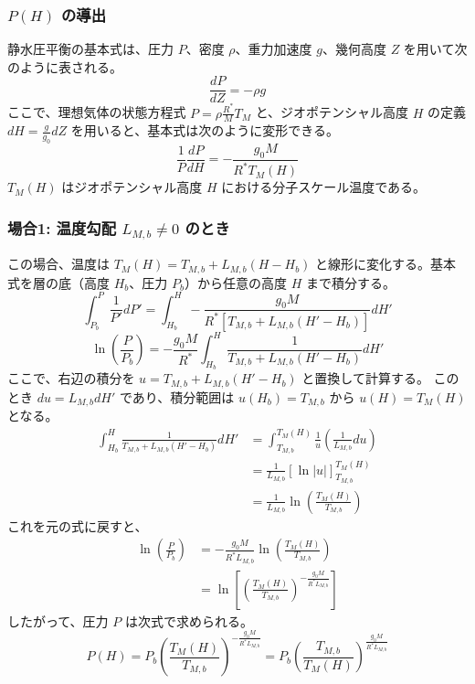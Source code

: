 \documentclass[a4paper,12pt]{article}
\begin{document}
\subsubsection*{$P(H)$ の導出}

静水圧平衡の基本式は、圧力 $P$、密度 $\rho$、重力加速度 $g$、幾何高度 $Z$ を用いて次のように表される。
\[
\frac{dP}{dZ} = - \rho g
\]
ここで、理想気体の状態方程式 $P = \rho \frac{R^*}{M} T_M$ と、ジオポテンシャル高度 $H$ の定義 $dH = \frac{g}{g_0} dZ$ を用いると、基本式は次のように変形できる。
\[
\frac{1}{P}\frac{dP}{dH} = -\frac{g_0 M}{R^*T_M(H)}
\]
$T_M(H)$ はジオポテンシャル高度 $H$ における分子スケール温度である。

\subsubsection*{場合1: 温度勾配 $L_{M,b} \neq 0$ のとき}

この場合、温度は $T_M(H) = T_{M,b} + L_{M,b}(H - H_b)$ と線形に変化する。基本式を層の底（高度 $H_b$、圧力 $P_b$）から任意の高度 $H$ まで積分する。
\[
\int_{P_b}^{P} \frac{1}{P'} dP' = \int_{H_b}^{H} -\frac{g_0 M}{R^* \left[ T_{M,b} + L_{M,b}(H' - H_b) \right]} dH'
\]
\[
\ln\left(\frac{P}{P_b}\right) = - \frac{g_0 M}{R^*} \int_{H_b}^{H} \frac{1}{T_{M,b} + L_{M,b}(H' - H_b)} dH'
\]
ここで、右辺の積分を $u = T_{M,b} + L_{M,b}(H' - H_b)$ と置換して計算する。
このとき $du = L_{M,b} dH'$ であり、積分範囲は $u(H_b) = T_{M,b}$ から $u(H) = T_M(H)$ となる。
\begin{align*}
\int_{H_b}^{H} \frac{1}{T_{M,b} + L_{M,b}(H' - H_b)} dH' &= \int_{T_{M,b}}^{T_M(H)} \frac{1}{u} \left(\frac{1}{L_{M,b}} du\right) \\
&= \frac{1}{L_{M,b}} \left[ \ln|u| \right]_{T_{M,b}}^{T_M(H)} \\
&= \frac{1}{L_{M,b}} \ln\left( \frac{T_M(H)}{T_{M,b}} \right)
\end{align*}
これを元の式に戻すと、
\begin{align*}
\ln\left(\frac{P}{P_b}\right) &= - \frac{g_0 M}{R^* L_{M,b}} \ln\left(\frac{T_M(H)}{T_{M,b}}\right) \\
&= \ln\left[ \left(\frac{T_M(H)}{T_{M,b}}\right)^{-\frac{g_0 M}{R^* L_{M,b}}} \right]
\end{align*}
したがって、圧力 $P$ は次式で求められる。
\[
P(H) = P_b \left( \frac{T_M(H)}{T_{M,b}} \right)^{-\frac{g_0 M}{R^* L_{M,b}}} = P_b \left( \frac{T_{M,b}}{T_M(H)} \right)^{\frac{g_0 M}{R^* L_{M,b}}}
\]
\end{document}
